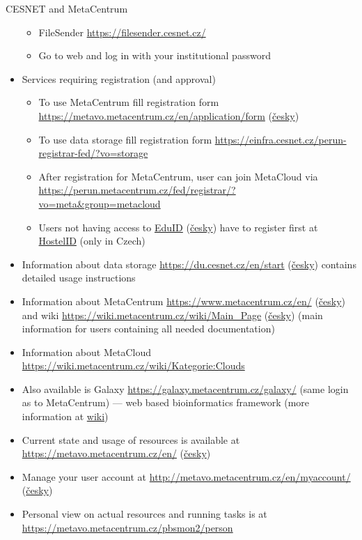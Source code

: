 \documentclass[compress, ucs, xelatex, 11pt, xcolor=svgnames, aspectratio=169,
	hyperref={
		bookmarks=true,
		unicode=true,
		colorlinks=true,
		pdftitle={Linux, command line and MetaCentrum},
		plainpages=false,
		pdfauthor={Vojtech Zeisek},
		pdfsubject={Course about use of Linux command line, writing shell scripts and using MetaCentrum of CESNET},
		pdfcreator={XeLaTeX},
		pdfkeywords={Linux, GNU, BASH, shell, command line, MetaCentrum},
		linkcolor=DarkRed, %
		anchorcolor=DarkBlue, %
		citecolor=Indigo, %
		filecolor=NavyBlue, %
		menucolor=DarkMagenta, %
		urlcolor=DarkBlue, %
		pdftex},
	url={hyphens, lowtilde} %
	]{beamer}
\begin{document}
\begin{frame}[allowframebreaks]{CESNET and MetaCentrum}
\begin{itemize}
\begin{itemize}
			\item FileSender \url{https://filesender.cesnet.cz/}
			\item Go to web and log in with your institutional password
		\end{itemize}
		\item Services requiring registration (and approval)
		\begin{itemize}
			\item To use MetaCentrum fill registration form \url{https://metavo.metacentrum.cz/en/application/form} (\href{https://metavo.metacentrum.cz/cs/application/}{česky})
			\item To use data storage fill registration form \url{https://einfra.cesnet.cz/perun-registrar-fed/?vo=storage}
			\item After registration for MetaCentrum, user can join MetaCloud via \url{https://perun.metacentrum.cz/fed/registrar/?vo=meta&group=metacloud}
			\item Users not having access to \href{https://www.eduid.cz/en/index}{EduID} (\href{https://www.eduid.cz/cs/index}{česky}) have to register first at \href{https://www.eduid.cz/cs/hostel}{HostelID} (only in Czech)
		\end{itemize}
		\item Information about data storage \url{https://du.cesnet.cz/en/start} (\href{https://du.cesnet.cz/cs/start}{česky}) contains detailed usage instructions
		\item Information about MetaCentrum \url{https://www.metacentrum.cz/en/} (\href{https://www.metacentrum.cz/cs/}{česky}) and wiki \url{https://wiki.metacentrum.cz/wiki/Main_Page} (\href{https://wiki.metacentrum.cz/wiki/Hlavn\%C3\%AD_strana}{česky}) (main information for users containing all needed documentation)
		\item Information about MetaCloud \url{https://wiki.metacentrum.cz/wiki/Kategorie:Clouds}
		\item Also available is Galaxy \url{https://galaxy.metacentrum.cz/galaxy/} (same login as to MetaCentrum) --- web based bioinformatics framework (more information at \href{https://wiki.metacentrum.cz/wiki/Galaxy}{wiki})
		\item Current state and usage of resources is available at \url{https://metavo.metacentrum.cz/en/} (\href{https://metavo.metacentrum.cz/cs/}{česky})
		\item Manage your user account at \url{http://metavo.metacentrum.cz/en/myaccount/} (\href{https://metavo.metacentrum.cz/cs/myaccount/}{česky})
		\item Personal view on actual resources and running tasks is at \url{https://metavo.metacentrum.cz/pbsmon2/person}

\end{itemize}
\end{frame}
\end{document}
